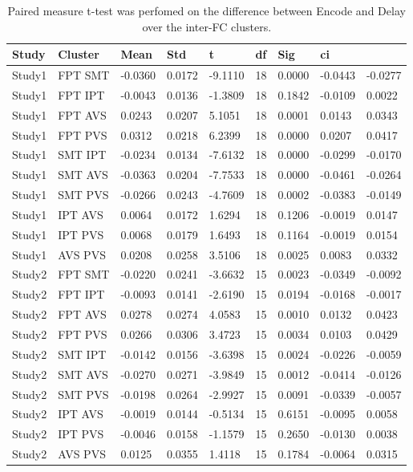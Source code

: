 \begin{table}
\centering
\begin{tabular}[0.2em]{@{}lllllllll@{}}\toprule
Study & Cluster & Mean & Std & t & df & Sig & ci\\\toprule[0.2em]
Study1 & FPT SMT & -0.0360 & 0.0172 & -9.1110 & 18 & 0.0000 & -0.0443 & -0.0277 \\\midrule
Study1 & FPT IPT & -0.0043 & 0.0136 & -1.3809 & 18 & 0.1842 & -0.0109 & 0.0022 \\\midrule
Study1 & FPT AVS & 0.0243 & 0.0207 & 5.1051 & 18 & 0.0001 & 0.0143 & 0.0343 \\\midrule
Study1 & FPT PVS & 0.0312 & 0.0218 & 6.2399 & 18 & 0.0000 & 0.0207 & 0.0417 \\\midrule
Study1 & SMT IPT & -0.0234 & 0.0134 & -7.6132 & 18 & 0.0000 & -0.0299 & -0.0170 \\\midrule
Study1 & SMT AVS & -0.0363 & 0.0204 & -7.7533 & 18 & 0.0000 & -0.0461 & -0.0264 \\\midrule
Study1 & SMT PVS & -0.0266 & 0.0243 & -4.7609 & 18 & 0.0002 & -0.0383 & -0.0149 \\\midrule
Study1 & IPT AVS & 0.0064 & 0.0172 & 1.6294 & 18 & 0.1206 & -0.0019 & 0.0147 \\\midrule
Study1 & IPT PVS & 0.0068 & 0.0179 & 1.6493 & 18 & 0.1164 & -0.0019 & 0.0154 \\\midrule
Study1 & AVS PVS & 0.0208 & 0.0258 & 3.5106 & 18 & 0.0025 & 0.0083 & 0.0332 \\\midrule
Study2 & FPT SMT & -0.0220 & 0.0241 & -3.6632 & 15 & 0.0023 & -0.0349 & -0.0092 \\\midrule
Study2 & FPT IPT & -0.0093 & 0.0141 & -2.6190 & 15 & 0.0194 & -0.0168 & -0.0017 \\\midrule
Study2 & FPT AVS & 0.0278 & 0.0274 & 4.0583 & 15 & 0.0010 & 0.0132 & 0.0423 \\\midrule
Study2 & FPT PVS & 0.0266 & 0.0306 & 3.4723 & 15 & 0.0034 & 0.0103 & 0.0429 \\\midrule
Study2 & SMT IPT & -0.0142 & 0.0156 & -3.6398 & 15 & 0.0024 & -0.0226 & -0.0059 \\\midrule
Study2 & SMT AVS & -0.0270 & 0.0271 & -3.9849 & 15 & 0.0012 & -0.0414 & -0.0126 \\\midrule
Study2 & SMT PVS & -0.0198 & 0.0264 & -2.9927 & 15 & 0.0091 & -0.0339 & -0.0057 \\\midrule
Study2 & IPT AVS & -0.0019 & 0.0144 & -0.5134 & 15 & 0.6151 & -0.0095 & 0.0058 \\\midrule
Study2 & IPT PVS & -0.0046 & 0.0158 & -1.1579 & 15 & 0.2650 & -0.0130 & 0.0038 \\\midrule
Study2 & AVS PVS & 0.0125 & 0.0355 & 1.4118 & 15 & 0.1784 & -0.0064 & 0.0315 \\\bottomrule[0.2em]
\end{tabular}
\caption{Paired measure t-test was perfomed on the difference between Encode and Delay over the inter-FC clusters.\label{tabel:GDEMFC}}
\end{table}
